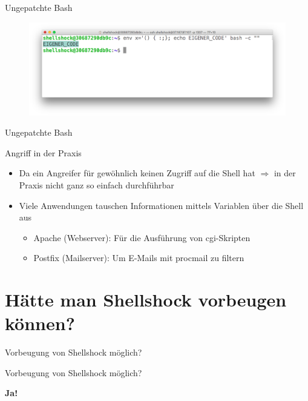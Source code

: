 \documentclass[handout]{beamer}
\begin{document}
\begin{frame}{Ungepatchte Bash}
\begin{figure}
  \centering
    \includegraphics[width=1\textwidth]{assets/example2}
\end{figure}
\end{frame}

\begin{frame}{Ungepatchte Bash}
  \begin{block}{Angriff in der Praxis}
    \begin{itemize}[<+->]
      \item Da ein Angreifer für gewöhnlich keinen Zugriff auf die Shell hat $\Rightarrow$ in der Praxis nicht ganz so einfach durchführbar
      \item Viele Anwendungen tauschen Informationen mittels Variablen über die Shell aus
      \begin{itemize}[<+->]
        \item Apache (Webserver): Für die Ausführung von cgi-Skripten
        \item Postfix (Mailserver): Um E-Mails mit procmail zu filtern
      \end{itemize}
    \end{itemize}
  \end{block}
\end{frame}


\section[Vorbeugung Shellshock?]{Hätte man Shellshock vorbeugen können?}
\begin{frame}{Vorbeugung von Shellshock möglich?}
\begin{center}
\begin{Huge}
\end{Huge}
\end{center}
\end{frame}

\begin{frame}{Vorbeugung von Shellshock möglich?}
\begin{center}
\begin{Huge}
\textbf{Ja!}
\end{Huge}
\end{center}
\end{frame}
\end{document}
